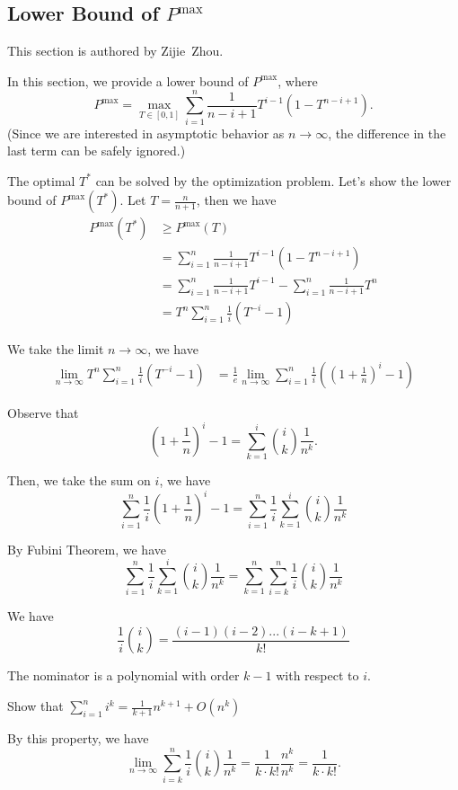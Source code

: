 \subsection{Lower Bound of $P^{\text{max}}$}
This section is authored by Zijie~Zhou.

In this section, we provide a lower bound of $P^{\text{max}}$, where
\[
P^{\text{max}} = \max_{T \in [0,1]}\sum_{i=1}^n\frac{1}{n-i+1} T^{i-1}(1-T^{n-i+1}).
\]
(Since we are interested in asymptotic behavior as $n \to \infty$, the difference in the last term can be safely ignored.)

The optimal $T^{*}$ can be solved by the optimization problem. Let's show the lower bound of $P^{\text{max}}(T^{*})$. Let $T=\frac{n}{n+1}$, then we have
\begin{align*}
    P^{\text{max}}(T^{*}) &\geq P^{\text{max}}(T) \\&= \sum_{i=1}^n\frac{1}{n-i+1} T^{i-1}(1-T^{n-i+1}) \\&= \sum_{i=1}^n\frac{1}{n-i+1} T^{i-1}- \sum_{i=1}^n\frac{1}{n-i+1} T^{n} \\&= T^n \sum_{i=1}^n\frac{1}{i} (T^{-i}-1) 
\end{align*}

We take the limit $n \to \infty$, we have
\begin{align*}
    \lim_{n \to \infty} T^n \sum_{i=1}^n\frac{1}{i} (T^{-i}-1)  &= \frac{1}{e} \lim_{n \to \infty} \sum_{i=1}^n\frac{1}{i} ((1+\frac{1}{n})^i-1)
\end{align*}

Observe that
\[
(1+\frac{1}{n})^i-1=\sum_{k=1}^{i}{i \choose k}\frac{1}{n^k}.
\]

Then, we take the sum on $i$, we have
\[
\sum_{i=1}^n \frac{1}{i}(1+\frac{1}{n})^i-1=\sum_{i=1}^n \frac{1}{i} \sum_{k=1}^{i}{i \choose k}\frac{1}{n^k}
\]

By Fubini Theorem, we have
\[
\sum_{i=1}^n \frac{1}{i} \sum_{k=1}^{i}{i \choose k}\frac{1}{n^k} = \sum_{k=1}^n \sum_{i=k}^{n}\frac{1}{i}{i \choose k}\frac{1}{n^k}
\]

We have
\[
\frac{1}{i}{i \choose k} = \frac{(i-1)(i-2)...(i-k+1)}{k!}
\]

The nominator is a polynomial with order $k-1$ with respect to $i$. 

{\color{red}  Show that $\sum_{i=1}^ni^k = \frac{1}{k+1}n^{k+1}+O(n^k)$}

By this property, we have 
\[
\lim_{n \to \infty} \sum_{i=k}^{n}\frac{1}{i}{i \choose k}\frac{1}{n^k} = \frac{1}{k \cdot k!}\frac{n^k}{n^k} = \frac{1}{k \cdot k!}.
\]

